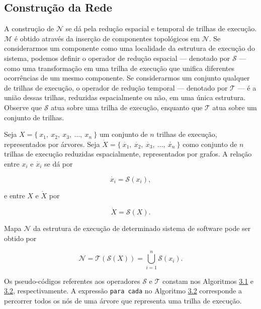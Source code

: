 \subsection{Construção da Rede}
\label{subsec:DataAquisition}

A construção de $\mathcal{N}$ se dá pela redução espacial e temporal de trilhas
de execução. $\mathcal{M}$ é obtido através da inserção de componentes
topológicos em $\mathcal{N}$.
Se considerarmos um componente como uma localidade da estrutura de execução do
sistema, podemos definir o operador de redução espacial --- denotado por
$\mathcal{S}$ --- como uma transformação em uma trilha de execução que unifica
diferentes ocorrências de um mesmo componente.
Se considerarmos um conjunto qualquer de trilhas de execução, o operador de
redução temporal --- denotado por $\mathcal{T}$ --- é a união dessas
trilhas, reduzidas espacialmente ou não, em uma única estrutura.
Observe que $\mathcal{S}$ atua sobre uma trilha de execução, enquanto que
$\mathcal{T}$ atua sobre um conjunto de trilhas.

Seja $X = \{ \ x_1, \ x_2, \ x_3, \ \dots, \ x_n \ \}$ um conjunto de $n$
trilhas de execução, representados por árvores.
Seja $\dot{X} = \{ \ \dot{x_1}, \ \dot{x_2}, \ \dot{x_3}, \ \dots, \ \dot{x_n} \ \}$
como conjunto de $n$ trilhas de execução reduzidas espacialmente, representados
por grafos.
A relação entre $x_i$ e $\dot{x_i}$ se dá por

\begin{equation}
	\dot{x_i} = \mathcal{S}(x_i),
\end{equation}

\noindent
e entre $X$ e $\dot{X}$ por

\begin{equation}
	\dot{X} = \mathcal{S}(X).
\end{equation}

Mapa $\mathcal{N}$ da estrutura de execução de determinado sistema de software
pode ser obtido por

\begin{equation}
	\mathcal{N} = \mathcal{T}(\mathcal{S}(X)) = \bigcup\limits_{i=1}^{n} \mathcal{S}(x_i).
\end{equation}

Os pseudo-códigos referentes aos operadores $\mathcal{S}$ e $\mathcal{T}$
constam nos Algoritmos \hyperref[Algorithm:SpatialReduction]{3.1} e
\hyperref[Algorithm:TemporalReduction]{3.2}, respectivamente. A expressão
\texttt{para cada} no Algoritmo \hyperref[Algorithm:SpatialReduction]{3.2}
corresponde a percorrer todos os nós de uma árvore que representa uma trilha de
execução.

